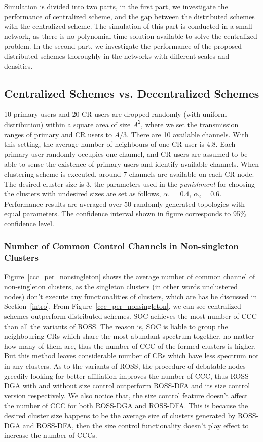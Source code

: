 \documentclass[10pt,journal,compsoc]{IEEEtran}
\theoremstyle{mytheoremstyle}
\theoremstyle{mytheoremstyle}
\theoremstyle{mytheoremstyle}
\begin{document}
Simulation is divided into two parts, in the first part, we investigate the performance of centralized scheme, and the gap between the distributed schemes with the centralized scheme.
The simulation of this part is conducted in a small network, as there is no polynomial time solution available to solve the centralized problem.
In the second part, we investigate the performance of the proposed distributed schemes thoroughly in the networks with different scales and densities.

\subsection{Centralized Schemes vs. Decentralized Schemes}
10 primary users and 20 CR users are dropped randomly (with uniform distribution) within a square area of size $A^{2}$, where we set the transmission ranges of primary and CR users to $A/3$.
There are 10 available channels. 
With this setting, the average number of neighbours of one CR user is 4.8.
Each primary user randomly occupies one channel, and CR users are assumed to be able to sense the existence of primary users and identify available channels.
When clustering scheme is executed, around 7 channels are available on each CR node.
The desired cluster size is 3, the parameters used in the \textit{punishment} for choosing the clusters with undesired sizes are set as follows, $\alpha_1 =  0.4$, $\alpha_2 =  0.6$.
Performance results are averaged over 50 randomly generated topologies with equal parameters.
The confidence interval shown in figure corresponds to 95\% confidence level.

\subsubsection{Number of Common Control Channels in Non-singleton Clusters}
\label{ccc_20}
Figure~\ref{ccc_per_nonsingleton} shows the average number of common channel of non-singleton clusters, as the singleton clusters (in other words unclustered nodes) don't execute any functionalities of clusters, which are has be discussed in Section~\ref{intro}.
From Figure~\ref{ccc_per_nonsingleton}, we can see centralized schemes outperform distributed schemes.
SOC achieves the most number of CCC than all the variants of ROSS.
The reason is, SOC is liable to group the neighbouring CRs which share the most abundant spectrum together, no matter how many of them are, thus the number of CCC of the formed clusters is higher.
But this method leaves considerable number of CRs which have less spectrum not in any clusters.
As to the variants of ROSS, the procedure of debatable nodes greedily looking for better affiliation improves the number of CCC, thus ROSS-DGA with and without size control outperform ROSS-DFA and its size control version respectively.
We also notice that, the size control feature doesn't affect the number of CCC for both ROSS-DGA and ROSS-DFA.
This is because the desired cluster size happens to be the average size of clusters generated by ROSS-DGA and ROSS-DFA, then the size control functionality doesn't play effect to increase the number of CCCs.
\end{document}
